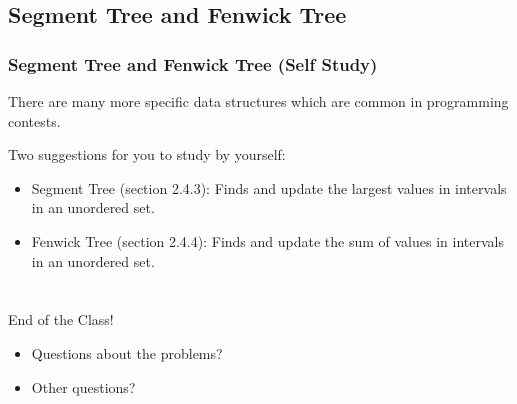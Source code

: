 \documentclass{beamer}
\begin{document}
\subsection{Segment Tree and Fenwick Tree}
\begin{frame}
  \frametitle{Segment Tree and Fenwick Tree (Self Study)}

  There are many more specific data structures
  which are common in programming contests.

  \bigskip

  Two suggestions for you to study by yourself:

  \bigskip

  \begin{itemize}
  \item Segment Tree (section 2.4.3): Finds and update the
    largest values in intervals in an unordered set.

  \item Fenwick Tree (section 2.4.4): Finds and update the
    sum of values in intervals in an unordered set.
  \end{itemize}

\end{frame}

\section{}
\begin{frame}
  End of the Class!

  \vfill

  \begin{itemize}
    \item Questions about the problems?
    \bigskip

    \item Other questions?
  \end{itemize}
\end{frame}
\end{document}
